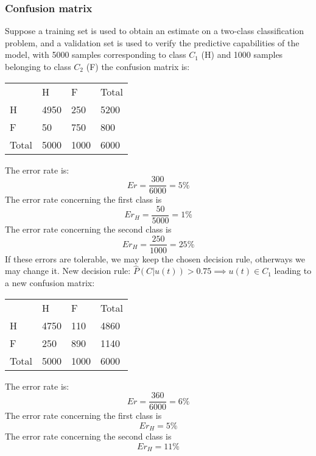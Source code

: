 \documentclass{book}
\begin{document}
\subsubsection{Confusion matrix}
Suppose a training set is used to obtain an estimate on a two-class classification problem, and a validation set is used to verify the predictive capabilities of the model, with 5000 samples corresponding to class $C_1$ (H) and 1000 samples belonging to class $C_2$ (F) the confusion matrix is:
\begin{table}[H]
\begin{tabular}{llll}
                           & H                         & F                         & Total                     \\ \cline{2-4} 
\multicolumn{1}{l|}{H}     & \multicolumn{1}{l|}{4950} & \multicolumn{1}{l|}{250}  & \multicolumn{1}{l|}{5200} \\ \cline{2-4} 
\multicolumn{1}{l|}{F}     & \multicolumn{1}{l|}{50}   & \multicolumn{1}{l|}{750}  & \multicolumn{1}{l|}{800}  \\ \cline{2-4} 
\multicolumn{1}{l|}{Total} & \multicolumn{1}{l|}{5000} & \multicolumn{1}{l|}{1000} & \multicolumn{1}{l|}{6000} \\ \cline{2-4} 
\end{tabular}
\end{table}
The error rate is:
\[
    Er = \displaystyle\frac{300}{6000}=5\%
\]
The error rate concerning the first class is 
\[
    Er_H = \displaystyle\frac{50}{5000}=1\%
\]
The error rate concerning the second class is 
\[
    Er_H = \displaystyle\frac{250}{1000}=25\%
\]
If these errors are tolerable, we may keep the chosen decision rule, otherways we may change it. New decision rule: $\hat{P}(C|u(t))>0.75 \implies u(t)\in C_1$ leading to a new confusion matrix: 
\begin{table}[H]
\begin{tabular}{llll}
                           & H                         & F                         & Total                     \\ \cline{2-4} 
\multicolumn{1}{l|}{H}     & \multicolumn{1}{l|}{4750} & \multicolumn{1}{l|}{110}  & \multicolumn{1}{l|}{4860} \\ \cline{2-4} 
\multicolumn{1}{l|}{F}     & \multicolumn{1}{l|}{250}  & \multicolumn{1}{l|}{890}  & \multicolumn{1}{l|}{1140} \\ \cline{2-4} 
\multicolumn{1}{l|}{Total} & \multicolumn{1}{l|}{5000} & \multicolumn{1}{l|}{1000} & \multicolumn{1}{l|}{6000} \\ \cline{2-4} 
\end{tabular}
\end{table}
The error rate is:
\[
    Er = \displaystyle\frac{360}{6000}=6\%
\]
The error rate concerning the first class is 
\[
    Er_H = 5\%
\]
The error rate concerning the second class is 
\[
    Er_H = 11\%
\]
\end{document}
